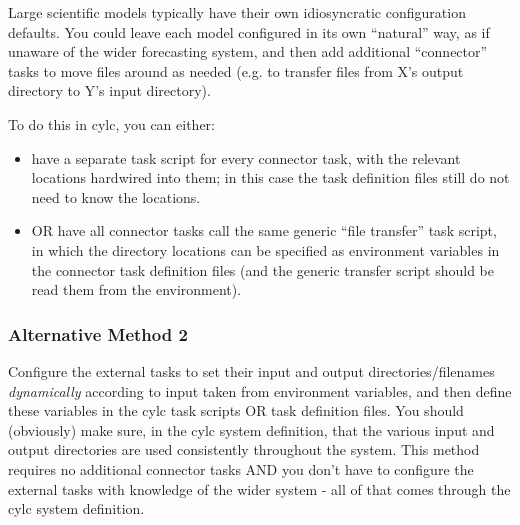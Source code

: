 \documentclass[11pt,a4paper]{article}
\begin{document}
Large scientific models typically have their own idiosyncratic
configuration defaults. You could leave each model configured in its own
``natural'' way, as if unaware of the wider forecasting system, and then
add additional ``connector'' tasks to move files around as needed
(e.g. to transfer files from X's output directory to Y's input directory).

To do this in cylc, you can either:

\begin{itemize}
    \item have a separate task script for every connector task, with the
        relevant locations hardwired into them; in this case the task
        definition files still do not need to know the locations.
    \item OR have all connector tasks call the same generic ``file
        transfer'' task script, in which the directory locations can be
        specified as environment variables in the connector task
        definition files (and the generic transfer script should be read
        them from the environment).
\end{itemize}

\subsubsection{Alternative Method 2}

Configure the external tasks to set their input and output
directories/filenames {\em dynamically} according to input taken from
environment variables, and then define these variables 
in the cylc task scripts OR task definition files. You should
(obviously) make sure, in the cylc system definition, that the various 
input and output directories are used consistently throughout the system. 
This method requires no additional connector tasks AND you don't have to
configure the external tasks with knowledge of the wider system - all of 
that comes through the cylc system definition. 

%
\end{document}
